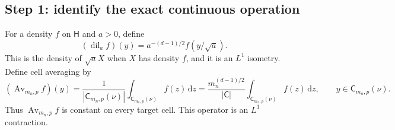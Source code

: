 \documentclass[11pt]{article}
\newcommand{\dd}{\,\mathrm d}
\newcommand{\htile}{\mathsf H}
\begin{document}
\subsection*{Step 1: identify the exact continuous operation}

For a density $f$ on $\htile$ and $a>0$, define
\[
  (\operatorname{dil}_a f)(y)
  =a^{-(d-1)/2}f(y/\sqrt a).
\]
This is the density of $\sqrt a X$ when $X$ has density $f$, and it is an
$L^1$ isometry.  Define cell averaging by
\[
  (\operatorname{Av}_{m_n,p}f)(y)
  =\frac{1}{|\mathsf C_{m_n,p}(\nu)|}
    \int_{\mathsf C_{m_n,p}(\nu)}f(z)\dd z
  =\frac{m_n^{(d-1)/2}}{|\mathsf C|}
    \int_{\mathsf C_{m_n,p}(\nu)}f(z)\dd z,
  \qquad y\in\mathsf C_{m_n,p}(\nu).
\]
Thus $\operatorname{Av}_{m_n,p}f$ is constant on every target cell.  This
operator is an $L^1$ contraction.
\end{document}
